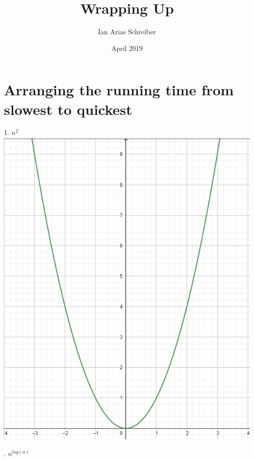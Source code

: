 \documentclass{article}
\title{Wrapping Up}
\author{Ian Arias Schreiber}
\date{April 2019}
\begin{document}
\maketitle
\section{Arranging the running time from slowest to quickest}
1. $n^{2}$
\newline
\newline
\newline
\includegraphics[scale = 0.5]{cuadratic}
\newline
\newline
\newline
\newline

. $n^{log(n)}$
\newline
\end{document}
